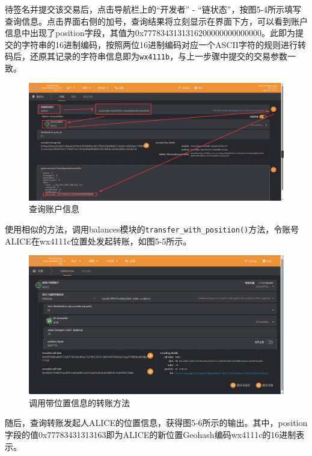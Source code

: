 待签名并提交该交易后，点击导航栏上的“开发者” - “链状态”，按图5-4所示填写查询信息。点击界面右侧的加号，查询结果将立刻显示在界面下方，可以看到账户信息中出现了position字段，其值为0x7778343131316200000000000000。此即为提交的字符串的16进制编码，按照两位16进制编码对应一个ASCII字符的规则进行转码后，还原其记录的字符串信息即为\verb|wx4111b|，与上一步骤中提交的交易参数一致。

\begin{figure}[htbp]
    \centering
    \includegraphics[width=\textwidth]{images/watchAccInfo.png}
    \caption{查询账户信息}\label{查询账户信息} %
\end{figure}

使用相似的方法，调用balances模块的\verb|transfer_with_position()|方法，令账号ALICE在wx4111c位置处发起转账，如图5-5所示。

\begin{figure}[H]
    \centering
    \includegraphics[width=\textwidth]{images/transWithPos.png}
    \caption{调用带位置信息的转账方法}\label{调用带位置信息的转账方法} %
\end{figure}

随后，查询转账发起人ALICE的位置信息，获得图5-6所示的输出。其中，position字段的值0x77783431313163即为ALICE的新位置Geohash编码wx4111c的16进制表示。

